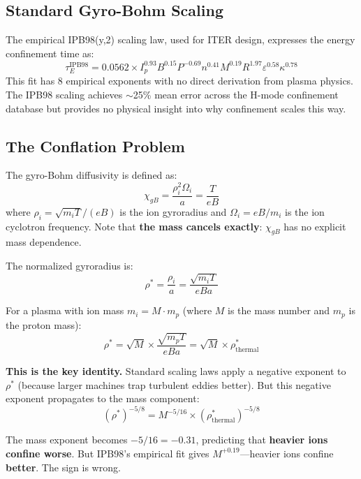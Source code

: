 \documentclass[11pt,letterpaper]{article}
\newcommand{\tauE}{\tau_E}
\newcommand{\chiGB}{\chi_{gB}}
\newcommand{\rhostar}{\rho^*}
\newcommand{\rhotherm}{\rho_{\text{thermal}}^*}
\begin{document}
\subsection{Standard Gyro-Bohm Scaling}

The empirical IPB98(y,2) scaling law, used for ITER design, expresses the energy confinement time as:
\begin{equation}
\tauE^{\text{IPB98}} = 0.0562 \times I_p^{0.93} B^{0.15} P^{-0.69} n^{0.41} M^{0.19} R^{1.97} \varepsilon^{0.58} \kappa^{0.78}
\end{equation}
This fit has 8 empirical exponents with no direct derivation from plasma physics. The IPB98 scaling achieves $\sim$25\% mean error across the H-mode confinement database but provides no physical insight into why confinement scales this way.

\subsection{The Conflation Problem}

The gyro-Bohm diffusivity is defined as:
\begin{equation}
\chiGB = \frac{\rho_i^2 \Omega_i}{a} = \frac{T}{eB}
\end{equation}
where $\rho_i = \sqrt{m_i T}/(eB)$ is the ion gyroradius and $\Omega_i = eB/m_i$ is the ion cyclotron frequency. Note that \textbf{the mass cancels exactly}: $\chiGB$ has no explicit mass dependence.

The normalized gyroradius is:
\begin{equation}
\rhostar = \frac{\rho_i}{a} = \frac{\sqrt{m_i T}}{eBa}
\end{equation}

For a plasma with ion mass $m_i = M \cdot m_p$ (where $M$ is the mass number and $m_p$ is the proton mass):
\begin{equation}
\rhostar = \sqrt{M} \times \frac{\sqrt{m_p T}}{eBa} = \sqrt{M} \times \rhotherm
\end{equation}

\textbf{This is the key identity.} Standard scaling laws apply a negative exponent to $\rhostar$ (because larger machines trap turbulent eddies better). But this negative exponent propagates to the mass component:
\begin{equation}
(\rhostar)^{-5/8} = M^{-5/16} \times (\rhotherm)^{-5/8}
\end{equation}

The mass exponent becomes $-5/16 = -0.31$, predicting that \textbf{heavier ions confine worse}. But IPB98's empirical fit gives $M^{+0.19}$---heavier ions confine \textbf{better}. The sign is wrong.
\end{document}
